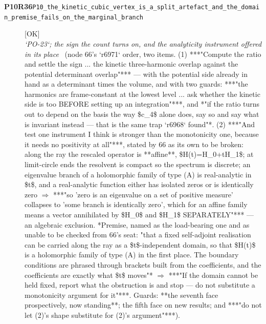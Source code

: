 \begin{description}
\item[\textbf{P10R36}\quad\texttt{P10\_the\_kinetic\_cubic\_vertex\_is\_a\_split\_artefact\_and\_the\_domain\_premise\_fails\_on\_the\_marginal\_branch}]\hfill\textsf{[OK]}\\
\textit{`PO-23`; the sign the count turns on, and the analyticity instrument offered in its place} \ (node 66's `r6971` order, two items. (1) ***"Compute the ratio and settle the sign ... the kinetic three-harmonic overlap against the potential determinant overlap"*** --- with the potential side already in hand as a determinant times the volume, and with two guards: ***"the harmonics are frame-constant at the lowest level ... ask whether the kinetic side is too BEFORE setting up an integration"***, and  *"if the ratio turns out to depend on the basis the way \$c\_4\$ alone does, say so and say what is invariant instead --- that is the same trap `r6968` found"*. (2) ***"And test one instrument I think is stronger than the monotonicity one, because it needs no positivity at all"***, stated by 66 as its own to be broken: along the ray the rescaled operator is **affine**, \$H(t)=H\_0+tH\_1\$; at limit-circle ends the resolvent is compact so the spectrum is discrete; an eigenvalue branch of a holomorphic family of type (A) is real-analytic in \$t\$, and a real-analytic function either has isolated zeros or is identically zero \ensuremath{\Rightarrow} ***"so 'zero is an eigenvalue on a set of positive measure' collapses to 'some branch is identically zero', which for an affine family means a vector annihilated by \$H\_0\$ and \$H\_1\$ SEPARATELY"*** --- an algebraic exclusion.  *Premise, named as the load-bearing one and as unable to be checked from 66's seat: "that a fixed self-adjoint realisation can be carried along the ray as a \$t\$-independent domain, so that \$H(t)\$ is a holomorphic family of type (A) in the first place. The boundary conditions are phrased through brackets built from the coefficients, and the coefficients are exactly what \$t\$ moves"* \ensuremath{\Rightarrow}  ***"If the domain cannot be held fixed, report what the obstruction is and stop --- do not substitute a monotonicity argument for it"***.  Guards: **the seventh face prospectively, now standing**; the fifth face on new results; and ***"do not let (2)'s shape substitute for (2)'s argument"***). 

\end{description}
